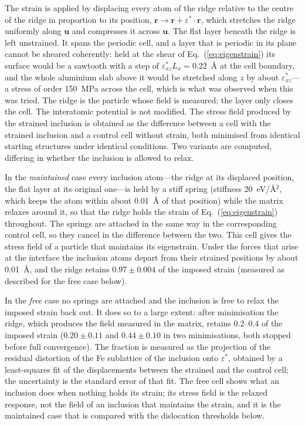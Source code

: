 The strain is applied by displacing every atom of the ridge relative to the
centre of the ridge in proportion to its position,
$\mathbf{r}\rightarrow\mathbf{r}+\varepsilon^{*}\!\cdot\!\mathbf{r}$, which
stretches the ridge uniformly along $\mathbf{u}$ and compresses it across
$\mathbf{u}$. The flat layer beneath the ridge is left unstrained. It spans
the periodic cell, and a layer that is periodic in its plane cannot be
sheared coherently: held at the shear of Eq.~(\ref{eq:eigenstrain}) its
surface would be a sawtooth with a step of $\varepsilon^{*}_{xz}L_x=0.22$~\AA{}
at the cell boundary, and the whole aluminium slab above it would be
stretched along $z$ by about $\varepsilon^{*}_{xz}$---a stress of order
150~MPa across the cell, which is what was observed when this was tried. The
ridge is the particle whose field is measured; the layer only closes the
cell. The interatomic potential is not modified. The stress field
produced by the strained inclusion is obtained as the difference between a
cell with the strained inclusion and a control cell without strain, both
minimised from identical starting structures under identical conditions. Two
variants are computed, differing in whether the inclusion is allowed to
relax.

In the \emph{maintained} case every inclusion atom---the ridge at its
displaced position, the flat layer at its original one---is held by a stiff
spring (stiffness 20~eV/\AA$^{2}$, which keeps the atom within about
0.01~\AA{} of that position) while the matrix relaxes around it, so that the
ridge holds the strain of Eq.~(\ref{eq:eigenstrain}) throughout. The springs
are attached in the same way in the corresponding control cell, so they
cancel in the difference between the two. This cell gives the stress field
of a particle that maintains its eigenstrain.
Under the forces that arise at the interface the inclusion atoms depart from
their strained positions by about 0.01~\AA{}, and the ridge retains
$0.97\pm0.004$ of the imposed strain (measured as described for the free case
below).

In the \emph{free} case no springs are attached and the inclusion is free to
relax the imposed strain back out. It does so to a large extent: after
minimisation the ridge, which produces the field measured in the matrix,
retains 0.2--0.4 of the imposed strain ($0.20\pm0.11$ and $0.44\pm0.10$ in
two minimisations, both stopped before full convergence). The fraction is measured as the
projection of the residual distortion of the Fe sublattice of the inclusion
onto $\varepsilon^{*}$, obtained by a least-squares fit of the displacements
between the strained and the control cell; the uncertainty is the standard
error of that fit. The free cell shows what an inclusion does when nothing
holds its strain; its stress field is the relaxed response, not the field of
an inclusion that maintains the strain, and it is the maintained case that is
compared with the dislocation thresholds below.

